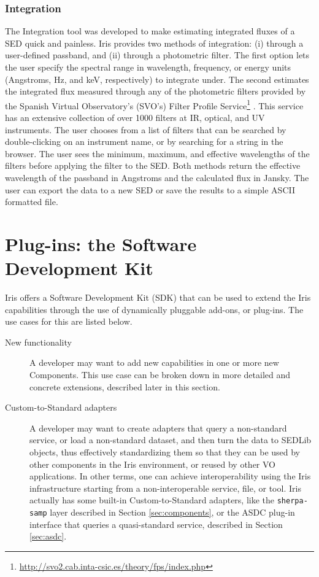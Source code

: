 \documentclass[preprint,authoryear,5p]{elsarticle}
\begin{document}
\subsubsection{Integration} The Integration tool was developed to make
estimating integrated fluxes of a SED quick and painless. Iris provides two
methods of integration: (i) through a user-defined passband, and (ii) through a
photometric filter. The first option lets the user specify the spectral range in
wavelength, frequency, or energy units (Angstroms, Hz, and keV, respectively) to
integrate under. The second estimates the integrated flux measured through any
of the photometric filters provided by the Spanish Virtual Observatory's (SVO's)
Filter Profile
Service\footnote{\url{http://svo2.cab.inta-csic.es/theory/fps/index.php}}
\citep{2013arXiv1312.3249S}. This service has an extensive collection
of over 1000 filters at IR, optical, and UV
instruments. The user chooses from a list of filters
that can be searched by double-clicking on an instrument name, or by searching
for a string in the browser. The user sees the minimum, maximum, and effective
wavelengths of the filters before applying the filter to the SED.
Both methods return the effective wavelength of the passband in Angstroms and
the calculated flux in Jansky. The user can export the data to a new SED or
save the results to a simple ASCII formatted file.

\section{Plug-ins: the Software Development Kit} \label{sec:plugins}

Iris offers a Software Development Kit (SDK) that can be used to extend the Iris
capabilities through the use of dynamically pluggable add-ons, or plug-ins.  The
use cases for this are listed below.
\begin{description} \item[New
functionality] A developer may want to add new capabilities in one or
more new Components. This use case can be broken down in more detailed and
concrete extensions, described later in this section.  \item[Custom-to-Standard
adapters] A developer may want to create adapters that query a non-standard
service, or load a non-standard dataset, and then turn the data to SEDLib
objects, thus effectively standardizing them so that they can be used by other
components in the Iris environment, or reused by other VO applications. In other
terms, one can achieve interoperability using the Iris infrastructure starting
from a non-interoperable service, file, or tool. Iris actually has some built-in
Custom-to-Standard adapters, like the \verb|sherpa-samp| layer described in Section
\ref{sec:components}, or the ASDC plug-in interface that queries a
quasi-standard service, described in Section \ref{sec:asdc}.  \end{description}
\end{document}
